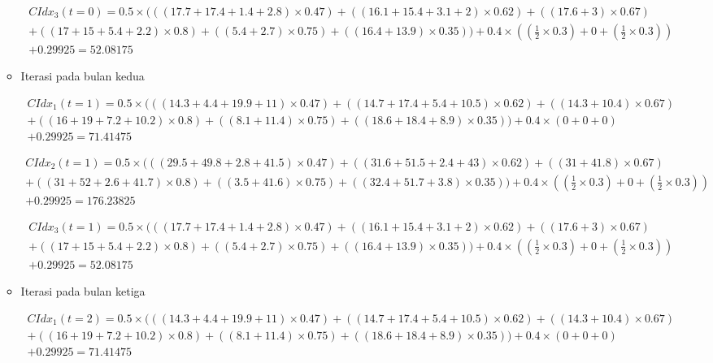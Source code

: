 \begin{itemize}
\begin{itemize}
\begin{multline}
	CIdx_{3}(t=0) = 0.5 \times (((17.7+17.4+1.4+2.8) \times 0.47) + ((16.1+15.4+3.1+2) \times 0.62) + ((17.6+3) \times 0.67)\\ + ((17+15+5.4+2.2) \times 0.8) + ((5.4+2.7) \times 0.75) + ((16.4+13.9) \times 0.35)) + 0.4 \times ((\frac {1} {2} \times 0.3) + 0 +  (\frac {1} {2} \times 0.3))\\ + 0.29925 = 52.08175
\end{multline}

	\item Iterasi pada bulan kedua
	
	\begin{multline}
	CIdx_{1}(t=1) = 0.5 \times (((14.3+4.4+19.9+11) \times 0.47) + ((14.7+17.4+5.4+10.5) \times 0.62) + ((14.3+10.4) \times 0.67)\\ + ((16+19+7.2+10.2) \times 0.8) + ((8.1+11.4) \times 0.75) + ((18.6+18.4+8.9) \times 0.35) ) + 0.4 \times (0 + 0 + 0)\\ + 0.29925 = 71.41475
\end{multline}	

\begin{multline}
	CIdx_{2}(t=1) = 0.5 \times (((29.5+49.8+2.8+41.5) \times 0.47) + ((31.6+51.5+2.4+43) \times 0.62) + ((31+41.8) \times 0.67)\\ + ((31+52+2.6+41.7) \times 0.8) + ((3.5+41.6) \times 0.75) + ((32.4+51.7 + 3.8) \times 0.35)) + 0.4 \times ((\frac {1} {2} \times 0.3) + 0 +  (\frac {1} {2} \times 0.3))\\ + 0.29925 = 176.23825
\end{multline}

\begin{multline}
	CIdx_{3}(t=1) = 0.5 \times (((17.7+17.4+1.4+2.8) \times 0.47) + ((16.1+15.4+3.1+2) \times 0.62) + ((17.6+3) \times 0.67)\\ + ((17+15+5.4+2.2) \times 0.8) + ((5.4+2.7) \times 0.75) + ((16.4+13.9) \times 0.35)) + 0.4 \times ((\frac {1} {2} \times 0.3) + 0 +  (\frac {1} {2} \times 0.3))\\ + 0.29925 = 52.08175
\end{multline}

	\item Iterasi pada bulan ketiga
	
	\begin{multline}
	CIdx_{1}(t=2) = 0.5 \times (((14.3+4.4+19.9+11) \times 0.47) + ((14.7+17.4+5.4+10.5) \times 0.62) + ((14.3+10.4) \times 0.67)\\ + ((16+19+7.2+10.2) \times 0.8) + ((8.1+11.4) \times 0.75) + ((18.6+18.4+8.9) \times 0.35) ) + 0.4 \times (0 + 0 + 0)\\ + 0.29925 = 71.41475
\end{multline}	


\end{itemize}
\end{itemize}
